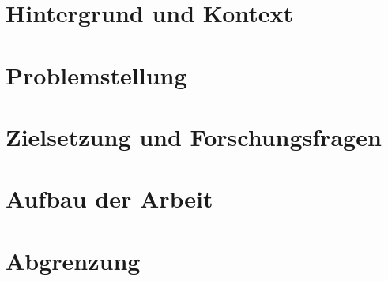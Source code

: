 \section{Hintergrund und Kontext}


\section{Problemstellung}


\section{Zielsetzung und Forschungsfragen}


\section{Aufbau der Arbeit}


\section{Abgrenzung}
